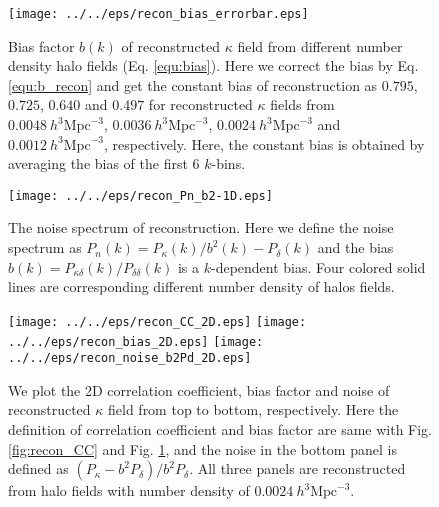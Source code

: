 \begin{figure}[tbp]
\begin{center}
\texttt{[image: ../../eps/recon\_bias\_errorbar.eps]}
\end{center}
\vspace{-0.7cm}
\caption{Bias factor $b(k)$ of reconstructed $\kappa$ field from different
 number density halo fields (Eq. \eqref{equ:bias}). 
 Here we correct the bias by 
 Eq. \eqref{equ:b_recon} and get the constant bias of reconstruction as 
 $0.795$, $0.725$, $0.640$ and $0.497$ for reconstructed $\kappa$ fields
 from $0.0048\ h^{3}\mathrm{Mpc}^{-3}$, $0.0036\ h^{3}\mathrm{Mpc}^{-3}$, 
$0.0024\ h^{3}\mathrm{Mpc}^{-3}$ and $0.0012\ h^{3}\mathrm{Mpc}^{-3}$,
 respectively.
Here, the constant bias is obtained by averaging 
the bias of the first 6 $k$-bins.}
\label{fig:recon_bias}
\end{figure}
\begin{figure}[tbp]
\begin{center}
\texttt{[image: ../../eps/recon\_Pn\_b2-1D.eps]}
\end{center}
\vspace{-0.7cm}
\caption{The noise spectrum of reconstruction. Here we define the noise 
spectrum as $P_{n}(k)=P_{\kappa}(k)/b^2(k)-P_{\delta}(k)$ and the bias 
$b(k)=P_{\kappa \delta}(k)/P_{\delta \delta}(k)$ is a $k$-dependent bias. 
Four colored solid lines are 
corresponding different number density of halos fields.}
\label{fig:recon_noise}
\end{figure}
\begin{figure}[tbp]
\begin{center}
\texttt{[image: ../../eps/recon\_CC\_2D.eps]}
\texttt{[image: ../../eps/recon\_bias\_2D.eps]}
\texttt{[image: ../../eps/recon\_noise\_b2Pd\_2D.eps]}
\end{center}
\vspace{-0.7cm}
\caption{We plot the 2D correlation coefficient, bias factor and noise 
of reconstructed $\kappa$ field from top to bottom, respectively. Here the 
definition of correlation coefficient and bias factor are same with
Fig. \ref{fig:recon_CC} and Fig. \ref{fig:recon_bias}, and the noise 
 in the bottom panel is defined as
 $(P_{\kappa}-b^2P_{\delta})/b^2P_{\delta}$. All three panels are
  reconstructed
 from halo fields with number density of $0.0024\ h^{3}\mathrm{Mpc}^{-3}$.
   }
\label{fig:recon_2D}
\end{figure}
